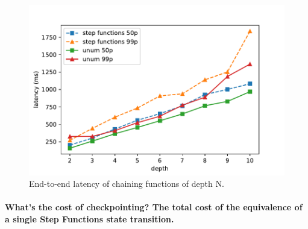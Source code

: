 \begin{figure}[t!]
    \centering
    \includegraphics[width=\columnwidth]{figures/ChainMicroLatency.pdf}
    \caption{End-to-end latency of chaining functions of depth N.}
    \label{fig:chainmicrolatency}
\end{figure}

\paragraph{What's the cost of checkpointing? The total cost of the equivalence
of a single Step Functions state transition.}









